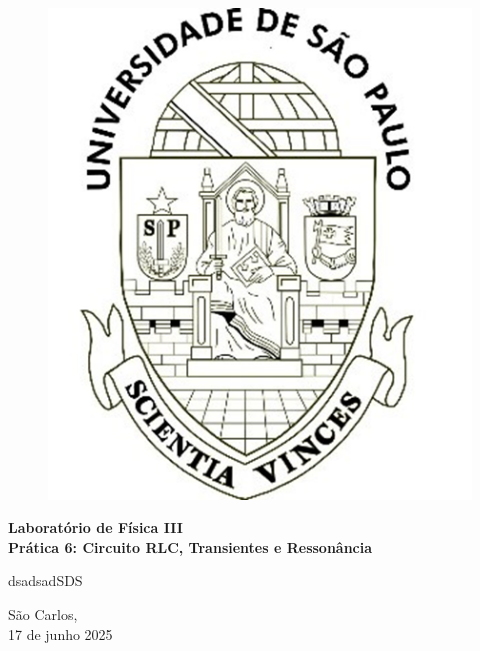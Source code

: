 \documentclass[12pt, a4]{article}
\begin{document}
\begin{titlepage}

\newcommand{\disciplina}{Laboratório de Física III}
\newcommand{\titulo}{Prática 6: Circuito RLC, Transientes e
Ressonância}
\newcommand{\autores}{dsadsadSDS

}
\newcommand{\prof}{Dr. Valmor Roberto Mastelaro}
\newcommand{\data}{São Carlos,\\ 17 de junho 2025}



\center



\begin{figure}[h!]
\centering 
\includegraphics[scale=0.5]{usplogo.png}
\end{figure}
\vspace{1.0cm}

\textbf{\LARGE\disciplina}\\[0.5cm]
\textbf{\Large\titulo}\\[1.0cm]

\begin{flushright}
\large\autores
\end{flushright}

\vfill
\data

\end{titlepage}
\pagebreak
\end{document}
